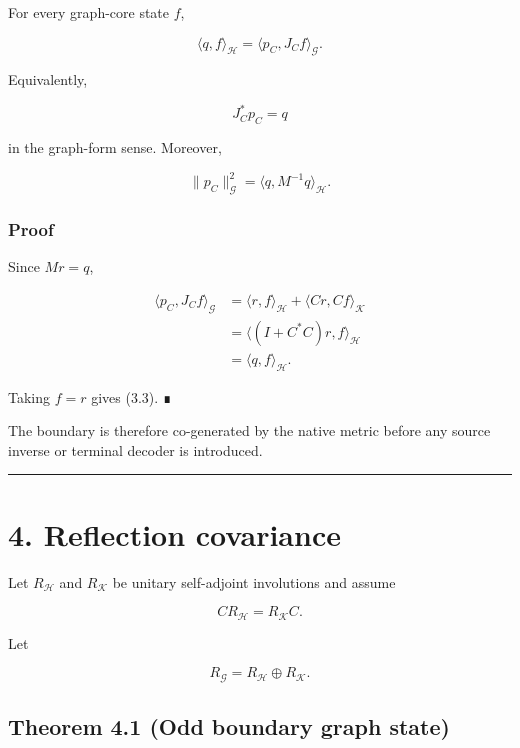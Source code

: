 For every graph-core state \(f\),

\[
\boxed{
\langle q,f\rangle_{\mathcal H}
=
\langle p_C,J_Cf\rangle_{\mathcal G}.
}
\tag{3.1}
\]

Equivalently,

\[
\boxed{J_C^*p_C=q}
\tag{3.2}
\]

in the graph-form sense. Moreover,

\[
\boxed{
\|p_C\|_{\mathcal G}^2
=
\langle q,M^{-1}q\rangle_{\mathcal H}.
}
\tag{3.3}
\]

\hypertarget{proof}{%
\subsubsection{Proof}\label{proof}}

Since \(Mr=q\),

\[
\begin{aligned}
\langle p_C,J_Cf\rangle_{\mathcal G}
&=
\langle r,f\rangle_{\mathcal H}
+
\langle Cr,Cf\rangle_{\mathcal K}\\
&=
\langle (I+C^*C)r,f\rangle_{\mathcal H}\\
&=
\langle q,f\rangle_{\mathcal H}.
\end{aligned}
\]

Taking \(f=r\) gives (3.3). ∎

The boundary is therefore co-generated by the native metric before any source
inverse or terminal decoder is introduced.

\begin{center}\rule{0.5\linewidth}{0.5pt}\end{center}

\hypertarget{reflection-covariance}{%
\section{4. Reflection covariance}\label{reflection-covariance}}

Let \(R_{\mathcal H}\) and \(R_{\mathcal K}\) be unitary self-adjoint
involutions and assume

\[
CR_{\mathcal H}=R_{\mathcal K}C.
\]

Let

\[
R_{\mathcal G}=R_{\mathcal H}\oplus R_{\mathcal K}.
\]

\hypertarget{theorem-4.1-odd-boundary-graph-state}{%
\subsection{Theorem 4.1 (Odd boundary graph state)}\label{theorem-4.1-odd-boundary-graph-state}}


